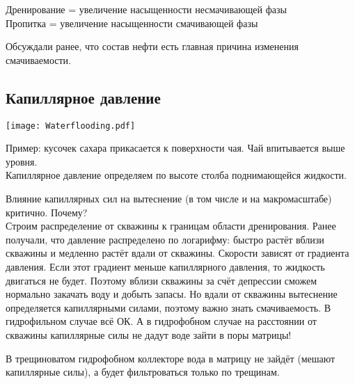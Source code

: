 \documentclass[main.tex]{subfiles}
\begin{document}

Дренирование = увеличение насыщенности несмачивающей фазы\\

Пропитка = увеличение насыщенности смачивающей фазы


Обсуждали ранее, что состав нефти есть главная причина изменения смачиваемости. 


\subsection{Капиллярное давление}

\texttt{[image: Waterflooding.pdf]}

Пример: кусочек сахара прикасается к поверхности чая. Чай впитывается выше уровня.\\

Капиллярное давление определяем по высоте столба поднимающейся жидкости.



Влияние капиллярных сил на вытеснение (в том числе и на макромасштабе) критично. Почему?\\

Строим распределение от скважины к границам области дренирования. Ранее получали, что давление распределено по логарифму: быстро растёт вблизи скважины и медленно растёт вдали от скважины. Скорости зависят от градиента давления. Если этот градиент меньше капиллярного давления, то жидкость двигаться не будет. Поэтому вблизи скважины за счёт депрессии сможем нормально закачать воду и добыть запасы. Но вдали от скважины вытеснение определяется капиллярными силами, поэтому важно знать смачиваемость. В гидрофильном случае всё ОК. А в гидрофобном случае на расстоянии от скважины капиллярные силы не дадут воде зайти в поры матрицы!


В трещиноватом гидрофобном коллекторе вода в матрицу не зайдёт (мешают капиллярные силы), а будет фильтроваться только по трещинам.\\
\end{document}
